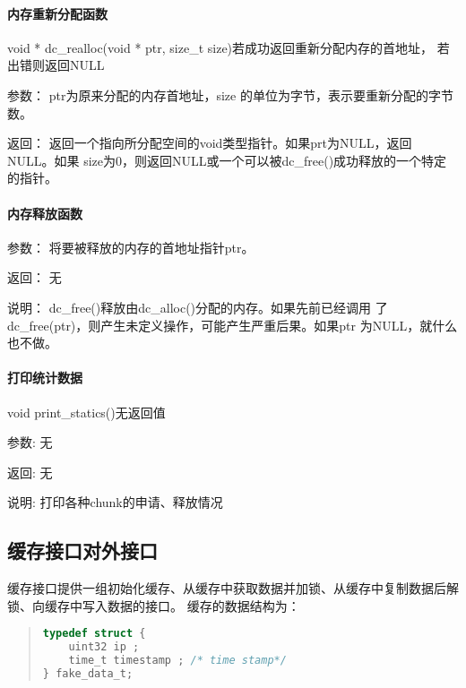 \paragraph{内存重新分配函数}
	{void * dc\_realloc(void * ptr, size\_t size)}{若成功返回重新分配内存的首地址，
	若出错则返回NULL}
	\begin{compactdesc}
	\item[参数：]ptr为原来分配的内存首地址，size 的单位为字节，表示要重新分配的字节数。
	\item[返回：]返回一个指向所分配空间的void类型指针。如果prt为NULL，返回NULL。如果
	size为0，则返回NULL或一个可以被dc\_free()成功释放的一个特定的指针。
	\end{compactdesc}
\paragraph{内存释放函数}
	\begin{compactdesc}
	\item[参数：]将要被释放的内存的首地址指针ptr。
	\item[返回：]无
	\item[说明：]dc\_free()释放由dc\_alloc()分配的内存。如果先前已经调用
		了dc\_free(ptr)，则产生未定义操作，可能产生严重后果。如果ptr
		为NULL，就什么也不做。 
	\end{compactdesc}

\paragraph{打印统计数据}
{void print\_statics()}{无返回值}
	\begin{compactdesc}
	\item[参数:]无
	\item[返回:]无
	\item[说明:]打印各种chunk的申请、释放情况
	\end{compactdesc}

\subsection{缓存接口对外接口}
缓存接口提供一组初始化缓存、从缓存中获取数据并加锁、从缓存中复制数据后解锁、向缓存中写入数据的接口。
缓存的数据结构为：
\begin{quote}
\begin{lstlisting}[language={C}]
typedef struct {
	uint32 ip ;
	time_t timestamp ; /* time stamp*/
} fake_data_t;
\end{lstlisting}
\end{quote}

